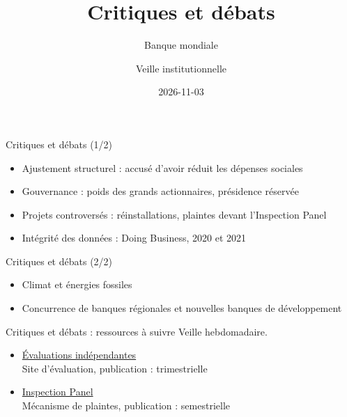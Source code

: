\documentclass[aspectratio=169,11pt]{beamer}
\title{Critiques et débats}
\subtitle{Banque mondiale}
\author{Veille institutionnelle}
\date{2026-11-03}
\begin{document}
\begin{frame}\titlepage\end{frame}

\begin{frame}{Critiques et débats (1/2)}
\begin{itemize}
\item Ajustement structurel : accusé d'avoir réduit les dépenses sociales
\item Gouvernance : poids des grands actionnaires, présidence réservée
\item Projets controversés : réinstallations, plaintes devant l'Inspection Panel
\item Intégrité des données : Doing Business, 2020 et 2021
\end{itemize}
\end{frame}

\begin{frame}{Critiques et débats (2/2)}
\begin{itemize}
\item Climat et énergies fossiles
\item Concurrence de banques régionales et nouvelles banques de développement
\end{itemize}
\end{frame}

\begin{frame}{Critiques et débats : ressources à suivre}
\small
Veille hebdomadaire.
\begin{itemize}
\item \href{https://ieg.worldbankgroup.org}{Évaluations indépendantes}\\{\footnotesize Site d'évaluation, publication : trimestrielle}
\item \href{https://www.inspectionpanel.org}{Inspection Panel}\\{\footnotesize Mécanisme de plaintes, publication : semestrielle}
\end{itemize}
\end{frame}
\end{document}
